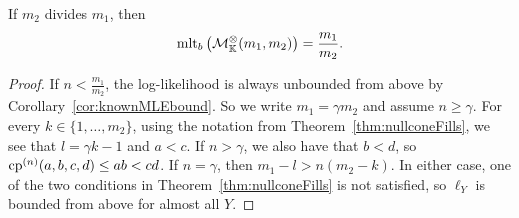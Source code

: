 \begin{cor}
	\label{cor:divisible}
	If $m_2$ divides $m_1$, then
		\[ \operatorname{mlt}_b \big( \mathcal{M}^{\otimes}_{\mathbb{K}}(m_1,m_2) \big) = \frac{m_1}{m_2} . \]
\end{cor}

\begin{proof}
	If $n < \frac{m_1}{m_2}$, the log-likelihood is always unbounded from above by Corollary~\ref{cor:knownMLEbound}.
	So we write $m_1 = \gamma m_2$ and assume $n \geq \gamma$.
	For every $k \in \{1, \ldots, m_2 \}$, 
	using the notation from Theorem~\ref{thm:nullconeFills}, we see that $l = \gamma k -1$ and $a < c$.
	If $n > \gamma$, we also have that $b < d$, so
	$\operatorname{cp}^{(n)}(a,b,c,d) \leq ab < cd$.
	If $n=\gamma$, then $m_1 - l > n(m_2-k)$.
	In either case, one of the two conditions in Theorem~\ref{thm:nullconeFills} is not satisfied, so $\ell_Y$ is bounded from above for almost all $Y$.
\end{proof}


